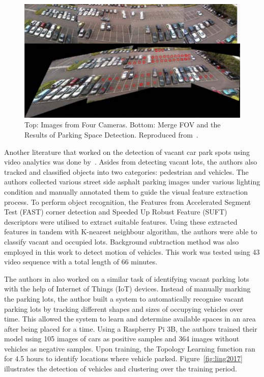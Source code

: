 \begin{figure}[hbt!]
  \centering
  \includegraphics[width=.7\textwidth]{image/lit/chenmerge.png}
  \caption[Top: Images from Four Cameras. Bottom: Merge FOV and the Results of Parking Space Detection.] {Top: Images from Four Cameras. Bottom: Merge FOV and the Results of Parking Space Detection. Reproduced from~\cite{chen2010vision}.}
\label{fig:chenmerge}
\end{figure}

Another literature that worked on the detection of vacant car park spots using video analytics was done by~\cite{marmol2016quickspot}. Asides from detecting vacant lots, the authors also tracked and classified objects into two categories: pedestrian and vehicles. The authors collected various street side asphalt parking images under various lighting condition and manually annotated them to guide the visual feature extraction process. To perform object recognition, the Features from Accelerated Segment Test (FAST) corner detection and Speeded Up Robust Feature (SUFT) descriptors were utilised to extract suitable features. Using these extracted features in tandem with K-nearest neighbour algorithm, the authors were able to classify vacant and occupied lots. Background subtraction method was also employed in this work to detect motion of vehicles. This work was tested using 43 video sequence with a total length of 66 minutes.

The authors in \cite{ling2017identifying} also worked on a similar task of identifying vacant parking lots with the help of Internet of Things (IoT) devices. Instead of manually marking the parking lots, the author built a system to automatically recognise vacant parking lots by tracking different shapes and sizes of occupying vehicles over time. This allowed the system to learn and determine available spaces in an area after being placed for a time. Using a Raspberry Pi 3B, the authors trained their model using 105 images of cars as positive samples and 364 images without vehicles as negative samples. Upon training, the Topology Learning function ran for 4.5 hours to identify locations where vehicle parked. Figure~\ref{fig:ling2017} illustrates the detection of vehicles and clustering over the training period. 


